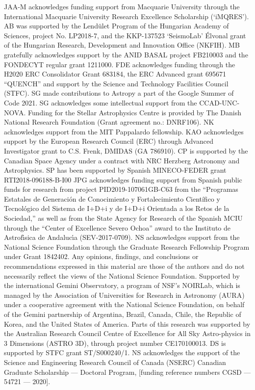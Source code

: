 \documentclass[modern]{aastex631}
\begin{document}
JAA-M acknowledges funding support from Macquarie University through the
International Macquarie University Research Excellence Scholarship (`iMQRES').
AB was supported by the Lend\"ulet Program of the Hungarian Academy of Sciences,
project No. LP2018-7, and the KKP-137523 `SeismoLab' \'Elvonal grant of the
Hungarian Research, Development and Innovation Office (NKFIH).
MB gratefully acknowledges support by the ANID BASAL project FB210003 and the
FONDECYT regular grant 1211000.
FDE acknowledges funding through the H2020 ERC Consolidator Grant 683184, the
ERC Advanced grant 695671 ``QUENCH'' and support by the Science and Technology
Facilities Council (STFC).
SG made contributions to Astropy a part of the Google Summer of Code 2021.
SG acknowledges some intellectual support from the CCAD-UNC-NOVA.
Funding for the Stellar Astrophysics Centre is provided by The Danish National
Research Foundation (Grant agreement no.: DNRF106).
NK acknowledges support from the MIT Pappalardo fellowship.
KAO acknowledges support by the European Research Council (ERC) through Advanced
Investigator grant to C.S. Frenk, DMIDAS (GA 786910).
CP is supported by the Canadian Space Agency under a contract with NRC Herzberg
Astronomy and Astrophysics.
SP has been supported by Spanish MINECO-FEDER grant RTI2018-096188-B-I00
JPG acknowledges funding support from Spanish public funds for research from
project PID2019-107061GB-C63 from the ``Programas Estatales de Generaci\'on de
Conocimiento y Fortalecimiento Cient\'ifico y Tecnol\'ogico del Sistema de I+D+i
y de I+D+i Orientada a los Retos de la Sociedad,'' as well as from the State
Agency for Research of the Spanish MCIU through the ``Center of Excellence
Severo Ochoa'' award to the Instituto de Astrof\'{\i}sica de Andaluc\'{\i}a
(SEV-2017-0709).
NS acknowledges support from the National Science Foundation through the
Graduate Research Fellowship Program under Grant 1842402. Any opinions,
findings, and conclusions or recommendations expressed in this material are
those of the authors and do not necessarily reflect the views of the National
Science Foundation.
Supported by the international Gemini Observatory, a program of NSF's NOIRLab,
which is managed by the Association of Universities for Research in Astronomy
(AURA) under a cooperative agreement with the National Science Foundation, on
behalf of the Gemini partnership of Argentina, Brazil, Canada, Chile, the
Republic of Korea, and the United States of America.
Parts of this research was supported by the Australian Research Council Centre
of Excellence for All Sky Astro-physics in 3 Dimensions (ASTRO 3D), through
project number CE170100013.
DS is supported by STFC grant ST/S000240/1.
NS acknowledges the support of the Science and Engineering Research Council of
Canada (NSERC) Canadian Graduate Scholarship — Doctoral Program, [funding
reference numbers CGSD — 54721 — 2020].
\end{document}
